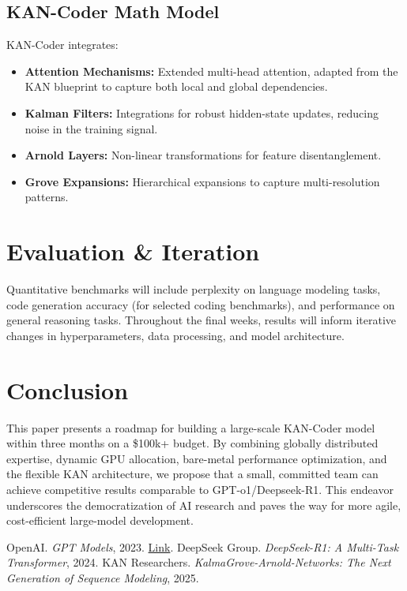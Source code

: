 \documentclass{article}
\begin{document}
\subsection{KAN-Coder Math Model}
KAN-Coder integrates:
\begin{itemize}
    \item \textbf{Attention Mechanisms:} Extended multi-head attention, adapted from the KAN blueprint to capture both local and global dependencies.
    \item \textbf{Kalman Filters:} Integrations for robust hidden-state updates, reducing noise in the training signal.
    \item \textbf{Arnold Layers:} Non-linear transformations for feature disentanglement.
    \item \textbf{Grove Expansions:} Hierarchical expansions to capture multi-resolution patterns.
\end{itemize}

\section{Evaluation \& Iteration}
Quantitative benchmarks will include perplexity on language modeling tasks, code generation accuracy (for selected coding benchmarks), and performance on general reasoning tasks. Throughout the final weeks, results will inform iterative changes in hyperparameters, data processing, and model architecture.

\section{Conclusion}
This paper presents a roadmap for building a large-scale KAN-Coder model within three months on a \$100k+ budget. By combining globally distributed expertise, dynamic GPU allocation, bare-metal performance optimization, and the flexible KAN architecture, we propose that a small, committed team can achieve competitive results comparable to GPT-o1/Deepseek-R1. This endeavor underscores the democratization of AI research and paves the way for more agile, cost-efficient large-model development.

\begin{thebibliography}{9}

 OpenAI. \textit{GPT Models}, 2023. \href{https://openai.com}{Link}.
 DeepSeek Group. \textit{DeepSeek-R1: A Multi-Task Transformer}, 2024.
 KAN Researchers. \textit{KalmaGrove-Arnold-Networks: The Next Generation of Sequence Modeling}, 2025.

\end{thebibliography}
\end{document}

